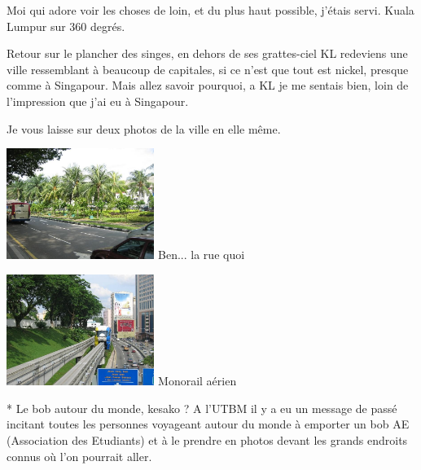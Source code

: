 \begin{multicols}{2}
Moi qui adore voir les choses de loin, et du plus haut possible, j'étais servi. Kuala Lumpur sur 360 degrés.

Retour sur le plancher des singes, en dehors de ses grattes-ciel KL redeviens une ville ressemblant à beaucoup de capitales, si ce n'est que tout est nickel, presque comme à Singapour. Mais allez savoir pourquoi, a KL je me sentais bien, loin de l'impression que j'ai eu à Singapour.

Je vous laisse sur deux photos de la ville en elle même.

\hspace*{-0.65cm}
\includegraphics[width=4.8cm]{articles/Kuala-lumpur/1211016874hbIL.jpg}
Ben... la rue quoi

\hspace*{-0.65cm}
\includegraphics[width=4.8cm]{articles/Kuala-lumpur/1211017229ryCi.jpg}
Monorail aérien

\end{multicols}

 * Le bob autour du monde, kesako ? A l'UTBM il y a eu un message de passé incitant toutes les personnes voyageant autour du monde à emporter un bob AE (Association des Etudiants) et à le prendre en photos devant les grands endroits connus où l'on pourrait aller.


